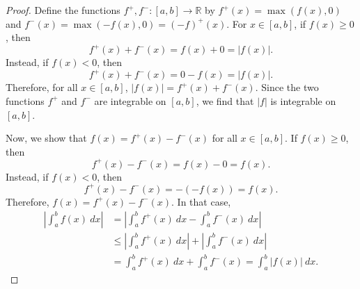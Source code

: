 \documentclass[a4paper, openany]{memoir}
\theoremstyle{definition}
\theoremstyle{plain}
\begin{document}
\begin{proof}
Define the functions $f^+, f^-: [a, b] \to \mathbb{R}$ by $f^+(x) = \max(f(x), 0)$ and $f^-(x) = \max(-f(x), 0) = (-f)^+(x)$. For $x \in [a, b]$, if $f(x) \geqslant 0$, then
\[f^+(x) + f^-(x) = f(x) + 0 = |f(x)|.\]
Instead, if $f(x) < 0$, then
\[f^+(x) + f^-(x) = 0 - f(x) = |f(x)|.\]
Therefore, for all $x \in [a, b]$, $|f(x)| = f^+(x) + f^-(x)$. Since the two functions $f^+$ and $f^-$ are integrable on $[a, b]$, we find that $|f|$ is integrable on $[a, b]$. 

\noindent Now, we show that $f(x) = f^+(x) - f^-(x)$ for all $x \in [a, b]$. If $f(x) \geqslant 0$, then
\[f^+(x) - f^-(x) = f(x) - 0 = f(x).\]
Instead, if $f(x) < 0$, then
\[f^+(x) - f^-(x) = -(-f(x)) = f(x).\]
Therefore, $f(x) = f^+(x) - f^-(x)$. In that case,
\begin{align*}
    \left|\int_a^b f(x) \ dx\right| &= \left|\int_a^b f^+(x) \ dx - \int_a^b f^-(x) \ dx\right| \\
    &\leqslant \left|\int_a^b f^+(x) \ dx\right| + \left|\int_a^b f^-(x) \ dx\right| \\
    &= \int_a^b f^+(x) \ dx + \int_a^b f^-(x) = \int_a^b |f(x)| \ dx.
\end{align*}

\end{proof}
\end{document}
